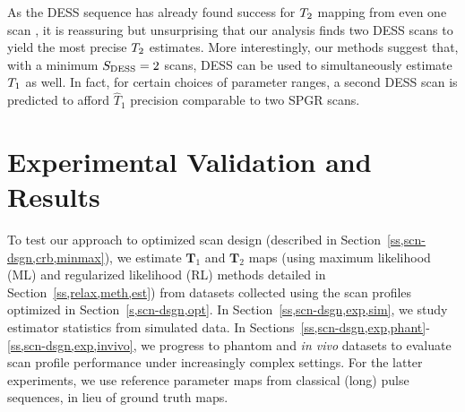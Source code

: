 As the DESS sequence has already found success 
for $T_2$ mapping from even one scan \cite{welsch:09:reo}, 
it is reassuring but unsurprising that our analysis finds two DESS scans 
to yield the most precise $T_2$ estimates. 
More interestingly, 
our methods suggest that, 
with a minimum $S_{\mathrm{DESS}} = 2$ scans, 
DESS can be used to simultaneously estimate $T_1$ as well. 
In fact, for certain choices of parameter ranges, 
a second DESS scan is predicted 
to afford $\widehat{T}_1$ precision 
comparable to two SPGR scans. 

\section{Experimental Validation and Results}
\label{s,scn-dsgn,exp}

To test our approach 
to optimized scan design 
(described in Section~\ref{ss,scn-dsgn,crb,minmax}), 
we estimate $\mathbf{T}_1$ and $\mathbf{T}_2$ maps 
(using maximum likelihood (ML) and 
regularized likelihood (RL) methods 
detailed in Section~\ref{ss,relax,meth,est}) 
from datasets collected 
using the scan profiles 
optimized in Section~\ref{s,scn-dsgn,opt}. 
In Section~\ref{ss,scn-dsgn,exp,sim}, 
we study estimator statistics from simulated data.
In Sections~\ref{ss,scn-dsgn,exp,phant}-\ref{ss,scn-dsgn,exp,invivo}, 
we progress to phantom and \emph{in vivo} datasets 
to evaluate scan profile performance 
under increasingly complex settings.
For the latter experiments, 
we use reference parameter maps 
from classical (long) pulse sequences, 
in lieu of ground truth maps.


